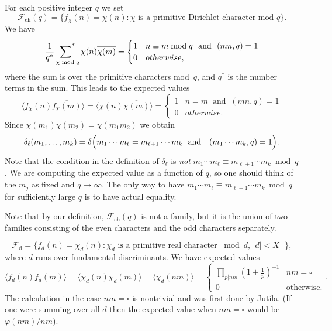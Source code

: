 \documentclass[12pt,letterpaper]{amsart}
\theoremstyle{plain}
\theoremstyle{definition}
\theoremstyle{remark}
\numberwithin{equation}{subsection}
\numberwithin{theorem}{subsection}
\numberwithin{table}{subsection}
\renewcommand{\mod}{\bmod}
\def\sumstar{\operatornamewithlimits{\sum\nolimits^*}}
\begin{document}
For each positive integer $q$ we set
\begin{equation}{\mathcal F}_{\text{ch}}(q)=\{f_\chi(n)=\chi(n): \chi \text{ is a primitive
Dirichlet character mod $q$}\}.
\end{equation}
We have
\begin{equation}
\frac{1}{q^*}\sumstar_{\chi \mod q} \chi(n)\overline{\chi(m)} =
\begin{cases}
1 & n\equiv m \mod q \ \text{ and } \ (mn,q)=1 \\
0 & otherwise ,
\end{cases}
\end{equation}
where
the sum is over the primitive characters mod~$q$, and $q^*$ is the number 
terms in the sum.
This leads to the
expected values
\begin{equation}
\langle f_\chi(n)\overline{f_\chi(m)}  \rangle 
=
\langle \chi(n)\overline{\chi(m)}  \rangle 
=
\begin{cases}
1& n= m \ \text{ and } \ (mn,q)=1\\
0& otherwise.
\end{cases}
\end{equation}
Since  $\chi(m_1)\chi(m_2)=\chi(m_1m_2)$   we obtain 
\begin{equation}
\delta_\ell(m_1,\dots,m_k)=\delta\Bigl(m_1\cdots m_\ell=m_{\ell+1}\cdots m_k
\ \ \mbox{and}\ \ \ (m_1\cdots m_k, q)=1\Bigr).
\end{equation}
Note that the condition in the definition of $\delta_\ell$ is \emph{not}
$m_1\cdots m_\ell\equiv m_{\ell+1}\cdots m_k\mod q$.  We are computing the
expected value as a function of $q$, so one should think of the $m_j$ as
fixed and $q\to\infty$.  The only way to have
$m_1\cdots m_\ell\equiv m_{\ell+1}\cdots m_k\mod q$ for sufficiently
large $q$ is to have actual equality.
 

Note that by our definition, ${\mathcal F}_{\text{ch}}(q)$ is not a family,
but it is the union of two families consisting of the even characters
and the odd characters separately.


\begin{equation}
{\mathcal F}_{\text{d}} =\{f_d(n)= \chi_d(n): \chi_d \text { is a primitive
real character $\mod d$, $|d|<X$  }\},
\end{equation}
where $d$ runs over fundamental discriminants.
 We have 
expected values
\begin{equation}
\langle f_d(n)f_d(m)\rangle =\langle  \chi_d(n)\chi_d(m) \rangle
=
\langle  \chi_d(nm) \rangle
=
\begin{cases}
\prod_{p|nm} (1+\frac1p)^{-1} & nm =\square \\
0& \text{otherwise}. 
\end{cases} .
\end{equation}
The calculation in the case $nm =\square$ is nontrivial and was first done
by Jutila\cite{J}.  (If one were summing over all $d$ then the
expected value when $nm =\square$ would be $\varphi(nm)/nm$).
 
\end{document}
